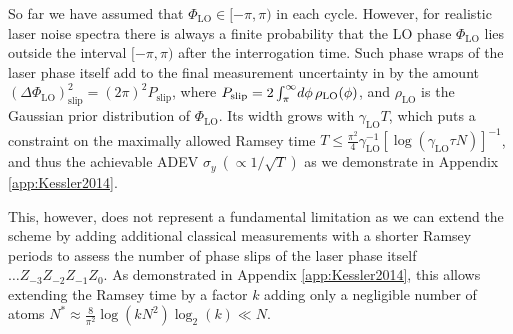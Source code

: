 
So far we have assumed that $\Phi_\mathrm{LO}\in[-\pi,\pi)$ in each cycle.
However, for realistic laser noise spectra there is always a finite probability
that the LO phase $\Phi_\mathrm{LO}$ lies outside the interval $[-\pi,\pi)$ after
the interrogation time. Such phase wraps of the laser phase itself add to the
final measurement uncertainty in  by the amount
$
	(\Delta\Phi_\mathrm{LO})^2_\mathrm{slip} =  (2\pi)^2P_\mathrm{slip}
$,
where 
$P_\mathrm{slip} = 2\intop_\pi^\infty \d{\phi} \rho_\mathrm{LO}(\phi)$,
and $\rho_\mathrm{LO}$ is the Gaussian prior distribution of $\Phi_\mathrm{LO}$.
Its width grows with $ \gamma_\mathrm{LO} T$, which puts a constraint on the
maximally allowed Ramsey time $T
\leq\frac{\pi^2}{4}\gamma_\mathrm{LO}^{-1}[\log(\gamma_\mathrm{LO}\tau N)]^{-1}$,
and thus the achievable ADEV $\sigma_y~(\propto 1/\sqrt T)$
 as we demonstrate in Appendix \ref{app:Kessler2014}.

This, however, does not represent a fundamental limitation as we can
extend the scheme by adding additional classical measurements with a shorter
Ramsey periods to assess the number of phase slips of
the laser phase itself $\hdots Z_{-3}Z_{-2}Z_{-1}Z_0$. As demonstrated in
Appendix \ref{app:Kessler2014}, this allows  extending the Ramsey time by a
factor $k$ adding only a negligible number of atoms $N^{*}\approx
\frac{8}{\pi^2} \log\left(k N^2\right)\log_2(k)\ll N$.

 
